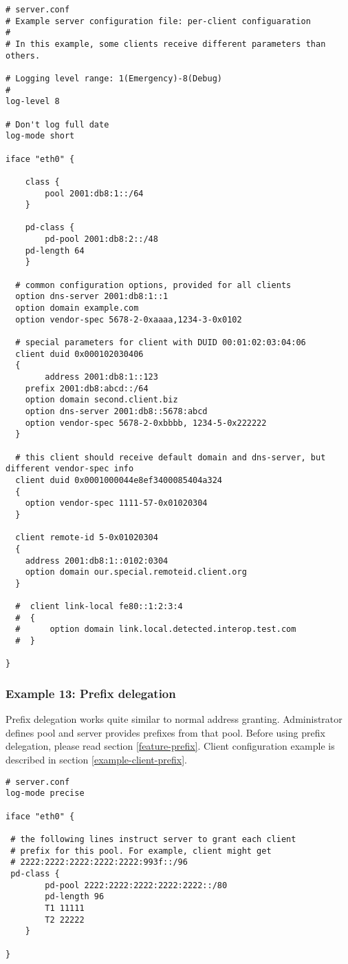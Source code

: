 \begin{lstlisting}
# server.conf
# Example server configuration file: per-client configuaration
#
# In this example, some clients receive different parameters than others.

# Logging level range: 1(Emergency)-8(Debug)
# 
log-level 8

# Don't log full date
log-mode short

iface "eth0" {

    class {
        pool 2001:db8:1::/64
    }

    pd-class {
        pd-pool 2001:db8:2::/48
	pd-length 64
    }

  # common configuration options, provided for all clients
  option dns-server 2001:db8:1::1
  option domain example.com
  option vendor-spec 5678-2-0xaaaa,1234-3-0x0102

  # special parameters for client with DUID 00:01:02:03:04:06      
  client duid 0x000102030406 
  {
        address 2001:db8:1::123
	prefix 2001:db8:abcd::/64
	option domain second.client.biz
	option dns-server 2001:db8::5678:abcd
	option vendor-spec 5678-2-0xbbbb, 1234-5-0x222222
  }

  # this client should receive default domain and dns-server, but different vendor-spec info
  client duid 0x0001000044e8ef3400085404a324
  {
	option vendor-spec 1111-57-0x01020304
  }
  
  client remote-id 5-0x01020304
  {
	address 2001:db8:1::0102:0304
	option domain our.special.remoteid.client.org
  }

  #  client link-local fe80::1:2:3:4
  #  {
  #      option domain link.local.detected.interop.test.com
  #  } 

}

\end{lstlisting}

\subsubsection{Example 13: Prefix delegation}
\label{example-server-prefix}

Prefix delegation works quite similar to normal address granting.
Administrator defines pool and server provides prefixes from that
pool. Before using prefix delegation, please read section
\ref{feature-prefix}. Client configuration example is described in section
\ref{example-client-prefix}.

\begin{lstlisting}
# server.conf
log-mode precise

iface "eth0" {

 # the following lines instruct server to grant each client
 # prefix for this pool. For example, client might get
 # 2222:2222:2222:2222:2222:993f::/96
 pd-class {
        pd-pool 2222:2222:2222:2222:2222::/80
        pd-length 96
        T1 11111
        T2 22222
    }

}
\end{lstlisting}

